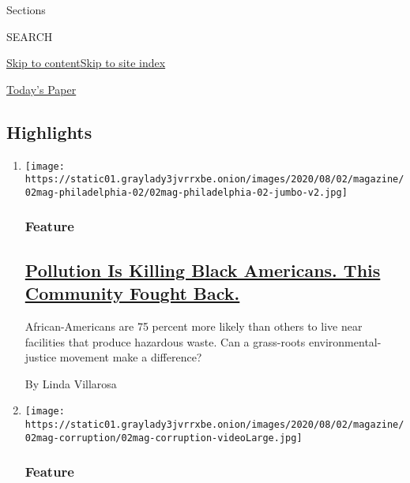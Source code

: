 Sections

SEARCH

\protect\hyperlink{site-content}{Skip to
content}\protect\hyperlink{site-index}{Skip to site index}

\href{https://myaccount.nytimes3xbfgragh.onion/auth/login?response_type=cookie\&client_id=vi}{}

\href{https://www.nytimes3xbfgragh.onion/section/todayspaper}{Today's
Paper}

\hypertarget{highlights}{%
\subsection{Highlights}\label{highlights}}

\begin{enumerate}
\def\labelenumi{\arabic{enumi}.}
\item
  \texttt{[image: https://static01.graylady3jvrrxbe.onion/images/2020/08/02/magazine/02mag-philadelphia-02/02mag-philadelphia-02-jumbo-v2.jpg]}

  \hypertarget{feature}{%
  \subsubsection{Feature}\label{feature}}

  \hypertarget{pollution-is-killing-black-americans-this-community-fought-back}{%
  \subsection{\texorpdfstring{\href{/2020/07/28/magazine/pollution-philadelphia-black-americans.html}{Pollution
  Is Killing Black Americans. This Community Fought
  Back.}}{Pollution Is Killing Black Americans. This Community Fought Back.}}\label{pollution-is-killing-black-americans-this-community-fought-back}}

  African-Americans are 75 percent more likely than others to live near
  facilities that produce hazardous waste. Can a grass-roots
  environmental-justice movement make a difference?

  By Linda Villarosa
\item
  \texttt{[image: https://static01.graylady3jvrrxbe.onion/images/2020/08/02/magazine/02mag-corruption/02mag-corruption-videoLarge.jpg]}

  \hypertarget{feature-1}{%
  \subsubsection{Feature}\label{feature-1}}


\end{enumerate}
